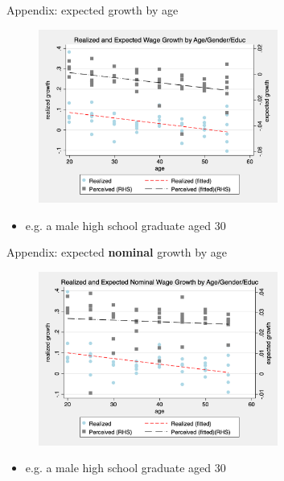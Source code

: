 \documentclass{beamer}
\begin{document}
\begin{frame}{Appendix: expected growth by age}
	\begin{figure}[ht]
		\label{appendix:age_gender_educ_level_compare_figure}
		\centering
		\includegraphics[width=0.7\textwidth]{figures/real_log_wage_gr_level_by_age_edu_gender_compare.png}
	\end{figure}
	\begin{itemize}
		\item e.g. a male high school graduate aged 30 
	\end{itemize}
\end{frame}


\begin{frame}{Appendix: expected \textbf{nominal} growth by age}
	\begin{figure}[ht]
		\label{appendix:age_gender_educ_nlevel_compare_figure}
		\centering
		\includegraphics[width=0.7\textwidth]{figures/real_log_wage_gr_nlevel_by_age_edu_gender_compare.png}
	\end{figure}
	\begin{itemize}
		\item e.g. a male high school graduate aged 30 
	\end{itemize}
\end{frame}
\end{document}
